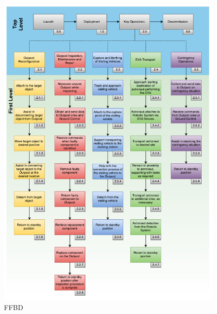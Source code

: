 \vspace{-10pt}
\begin{figure}[H]
\centering
\includegraphics[width=\textwidth, height=0.91\textheight, keepaspectratio]{Figures/FFBD}
\caption{\acrlong{FFBD}}
\label{fig:FFBD}
\end{figure}


